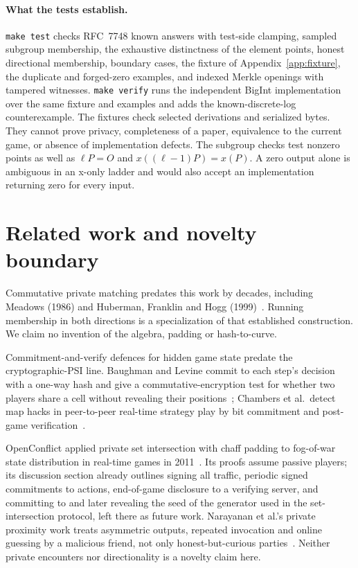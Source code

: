 \documentclass[11pt]{article}
\begin{document}
\paragraph{What the tests establish.}
\texttt{make test} checks RFC~7748 known answers with test-side clamping,
sampled subgroup membership, the exhaustive distinctness of the element
points, honest directional membership, boundary cases, the fixture of
Appendix~\ref{app:fixture}, the duplicate and forged-zero examples, and
indexed Merkle openings with tampered witnesses. \texttt{make verify} runs
the independent BigInt implementation over the same fixture and examples and
adds the known-discrete-log counterexample. The fixtures check selected
derivations and serialized bytes. They cannot prove privacy,
completeness of a paper, equivalence to the current game, or absence of
implementation defects. The subgroup checks test nonzero points as well as $\ell P=O$ and
$x((\ell-1)P)=x(P)$. A zero output alone is ambiguous in an x-only ladder and
would also accept an implementation returning zero for every input.

\section{Related work and novelty boundary}
\label{sec:prior}

Commutative private matching predates this work by decades, including Meadows
(1986) and Huberman, Franklin and Hogg (1999)~\cite{meadows86,hfh99}.
Running membership in both directions is a specialization of that established
construction. We claim no invention of the algebra, padding or hash-to-curve.

Commitment-and-verify defences for hidden game state predate the
cryptographic-PSI line. Baughman and Levine commit to each step's decision
with a one-way hash and give a commutative-encryption test for whether two
players share a cell without revealing their positions~\cite{baughman01};
Chambers et al.\ detect map hacks in peer-to-peer real-time strategy play by
bit commitment and post-game verification~\cite{chambers05}.

OpenConflict applied private set intersection with chaff padding to
fog-of-war state distribution in real-time games in
2011~\cite{openconflict}. Its proofs assume passive players; its discussion
section already outlines signing all traffic, periodic signed commitments to
actions, end-of-game disclosure to a verifying server, and committing to and
later revealing the seed of the generator used in the set-intersection
protocol, left there as future work. Narayanan et al.'s private proximity
work treats asymmetric outputs, repeated invocation and online guessing by a
malicious friend, not only honest-but-curious parties~\cite{narayanan11}.
Neither private encounters nor directionality is a novelty claim here.
\end{document}
